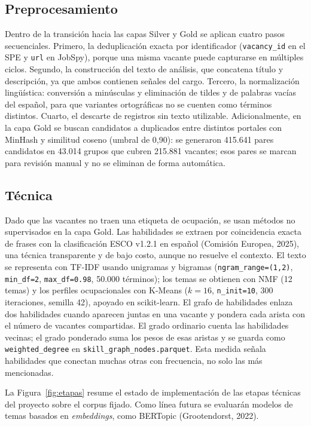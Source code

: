 \documentclass[journal]{IEEEtran}
\begin{document}
\subsection{Preprocesamiento}
Dentro de la transición hacia las capas Silver y Gold se aplican cuatro pasos secuenciales. Primero, la deduplicación exacta por identificador (\texttt{vacancy\_id} en el SPE y \texttt{url} en JobSpy), porque una misma vacante puede capturarse en múltiples ciclos. Segundo, la construcción del texto de análisis, que concatena título y descripción, ya que ambos contienen señales del cargo. Tercero, la normalización lingüística: conversión a minúsculas y eliminación de tildes y de palabras vacías del español, para que variantes ortográficas no se cuenten como términos distintos. Cuarto, el descarte de registros sin texto utilizable. Adicionalmente, en la capa Gold se buscan candidatos a duplicados entre distintos portales con MinHash y similitud coseno (umbral de 0,90): se generaron 415.641 pares candidatos en 43.014 grupos que cubren 215.881 vacantes; esos pares se marcan para revisión manual y no se eliminan de forma automática.

\subsection{Técnica}
Dado que las vacantes no traen una etiqueta de ocupación, se usan métodos no supervisados en la capa Gold. Las habilidades se extraen por coincidencia exacta de frases con la clasificación ESCO v1.2.1 en español (Comisión Europea, 2025), una técnica transparente y de bajo costo, aunque no resuelve el contexto. El texto se representa con TF-IDF usando unigramas y bigramas (\texttt{ngram\_range=(1,2)}, \texttt{min\_df=2}, \texttt{max\_df=0.98}, 50.000 términos); los temas se obtienen con NMF (12 temas) y los perfiles ocupacionales con K-Means ($k=16$, \texttt{n\_init=10}, 300 iteraciones, semilla 42), apoyado en scikit-learn. El grafo de habilidades enlaza dos habilidades cuando aparecen juntas en una vacante y pondera cada arista con el número de vacantes compartidas. El grado ordinario cuenta las habilidades vecinas; el grado ponderado suma los pesos de esas aristas y se guarda como \texttt{weighted\_degree} en \texttt{skill\_graph\_nodes.parquet}. Esta medida señala habilidades que conectan muchas otras con frecuencia, no solo las más mencionadas.

La Figura~\ref{fig:etapas} resume el estado de implementación de las etapas técnicas del proyecto sobre el corpus fijado. Como línea futura se evaluarán modelos de temas basados en \textit{embeddings}, como BERTopic (Grootendorst, 2022).
\end{document}
